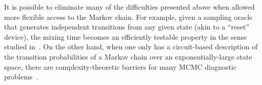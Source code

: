It is possible to eliminate many of the difficulties presented above
when allowed more flexible access
to the Markov chain.
For example, given a sampling oracle that generates
independent transitions from any given state (akin to a ``reset''
device), the mixing time becomes an efficiently testable property in
the sense studied in~\citet{BaFoRuSmiWhi00,BaFoRuSmiWhi13}.
On the other hand, when one only has a circuit-based description of
the transition probabilities of a Markov chain over an
exponentially-large state space, there are complexity-theoretic
barriers for many MCMC diagnostic problems~\citet{BhaBoMo11}.
%
%
